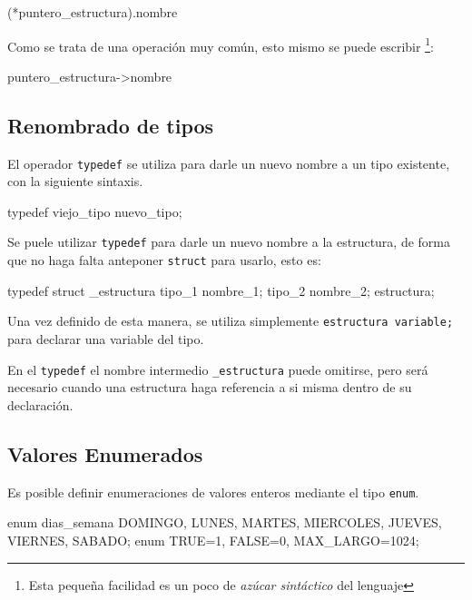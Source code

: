 \begin{codigo-c-plano}
(*puntero_estructura).nombre
\end{codigo-c-plano}

Como se trata de una operación muy común, esto mismo se puede escribir
\footnote{Esta pequeña facilidad es un poco de \textit{azúcar sintáctico} del
lenguaje}:

\begin{codigo-c-plano}
puntero_estructura->nombre
\end{codigo-c-plano}

\subsection{Renombrado de tipos}

El operador \lstinline!typedef! se utiliza para darle un nuevo nombre a un
tipo existente, con la siguiente sintaxis.

\begin{codigo-c-plano}
typedef viejo_tipo nuevo_tipo;
\end{codigo-c-plano}

Se puele utilizar \lstinline!typedef! para darle un nuevo nombre a la
estructura, de forma que no haga falta anteponer
\lstinline!struct! para usarlo, esto es:

\begin{codigo-c-plano}
typedef struct _estructura {
    tipo_1 nombre_1;
    tipo_2 nombre_2; } estructura;
\end{codigo-c-plano}

Una vez definido de esta manera, se utiliza simplemente
\lstinline!estructura variable;! para declarar una variable del tipo.

En el \lstinline!typedef! el nombre intermedio \lstinline!_estructura! puede
omitirse, pero será necesario cuando una estructura haga referencia a si misma
dentro de su declaración.

\subsection{Valores Enumerados}

Es posible definir enumeraciones de valores enteros mediante el tipo
\lstinline!enum!.

\begin{codigo-c-plano}
enum dias_semana {DOMINGO, LUNES, MARTES, MIERCOLES, JUEVES, VIERNES,
                  SABADO};
enum {TRUE=1, FALSE=0, MAX_LARGO=1024};
\end{codigo-c-plano}

